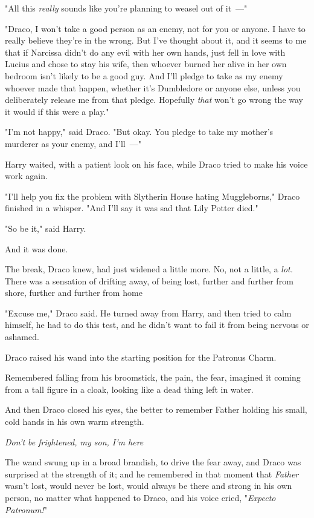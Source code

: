 "All this \emph{really} sounds like you're planning to weasel out of it~---"

"Draco, I won't take a good person as an enemy, not for you or anyone. I have
to really believe they're in the wrong. But I've thought about it, and it seems
to me that if Narcissa didn't do any evil with her own hands, just fell in love
with Lucius and chose to stay his wife, then whoever burned her alive in her
own bedroom isn't likely to be a good guy. And I'll pledge to take as my enemy
whoever made that happen, whether it's Dumbledore or anyone else, unless you
deliberately release me from that pledge. Hopefully \emph{that} won't go wrong
the way it would if this were a play."

"I'm not happy," said Draco. "But okay. You pledge to take my mother's murderer
as your enemy, and I'll~---"

Harry waited, with a patient look on his face, while Draco tried to make his
voice work again.

"I'll help you fix the problem with Slytherin House hating Muggleborns," Draco
finished in a whisper. "And I'll say it was sad that Lily Potter died."

"So be it," said Harry.

And it was done.

The break, Draco knew, had just widened a little more. No, not a little, a
\emph{lot.} There was a sensation of drifting away, of being lost, further and
further from shore, further and further from home{\el}

"Excuse me," Draco said. He turned away from Harry, and then tried to calm
himself, he had to do this test, and he didn't want to fail it from being
nervous or ashamed.

Draco raised his wand into the starting position for the Patronus Charm.

Remembered falling from his broomstick, the pain, the fear, imagined it coming
from a tall figure in a cloak, looking like a dead thing left in water.

And then Draco closed his eyes, the better to remember Father holding his
small, cold hands in his own warm strength.

\emph{Don't be frightened, my son, I'm here{\el}}

The wand swung up in a broad brandish, to drive the fear away, and Draco was
surprised at the strength of it; and he remembered in that moment that
\emph{Father} wasn't lost, would never be lost, would always be there and
strong in his own person, no matter what happened to Draco, and his voice
cried, "\emph{Expecto Patronum!}"

